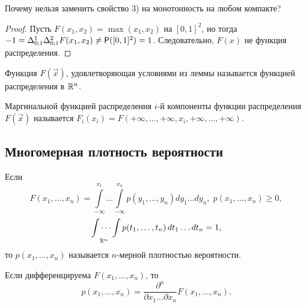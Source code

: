 \begin{note}
	Почему нельзя заменить свойство 3) на монотонность на любом компакте? 
	\begin{proof}
		Пусть $F(x_1, x_2) = \max(x_1, x_2)$ на $[0, 1]^2$, но тогда $-1 = \Delta_{0; 1}^1 \Delta_{0; 1}^2 F(x_1, x_2) \neq \P([0, 1]^2) = 1$. Следовательно, $F(x)$ не функция распределения.
	\end{proof}
\end{note}

\begin{definition}
	Функция $F(\vec x)$, удовлетворяющая условиями из леммы называется функцией распределения в $\R^n$.
\end{definition}

\begin{definition}
    Маргинальной функцией распределения $i$-й компоненты функции распределения $F(\vec x)$ называется $F_i (x_i) = F(+\infty, \dots, +\infty, x_i, +\infty, \dots, +\infty)$.
\end{definition}

\subsection{Многомерная плотность вероятности}
\begin{definition}
	Если 
	$$ F(x_1, \ldots, x_n) = \int\limits_{-\infty}^{x_1}\dots\int\limits_{-\infty}^{x_n} p(y_1, \ldots, y_n)dy_1\ldots dy_n,\; p(x_1, \ldots, x_n) \geqslant 0, $$
	$$ \idotsint\limits_{\R^n} p(t_1, \dots, t_n) \,dt_1 \dots dt_n = 1,$$
	то $p(x_1, \ldots, x_n)$ называется $n$-мерной плотностью вероятности.
	
	Если дифференцируема $F(x_1, \dots, x_n)$, то
	$$ p(x_1, \ldots, x_n) = \frac{\partial^n}{\partial x_1\ldots\partial x_n}F(x_1, \ldots, x_n). $$
\end{definition}